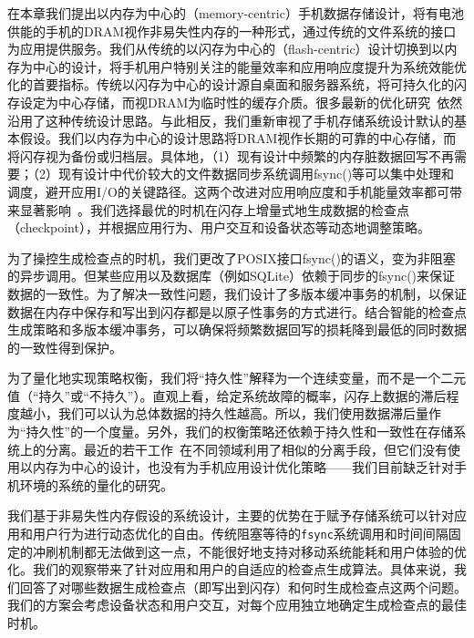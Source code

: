 在本章我们提出以内存为中心的（memory-centric）手机数据存储设计，将有电池供能的手机的DRAM视作非易失性内存的一种形式，通过传统的文件系统的接口为应用提供服务。我们从传统的以闪存为中心的（flash-centric）设计切换到以内存为中心的设计，将手机用户特别关注的能量效率和应用响应度提升为系统效能优化的首要指标。传统以闪存为中心的设计源自桌面和服务器系统，将可持久化的闪存设定为中心存储，而视DRAM为临时性的缓存介质。很多最新的优化研究~\cite{Jeong:2013:ISO:2535461.2535499, 6558430, Kim:2014:RJJ:2591305.2591332,
Nguyen:2014:ISR:2638728.2638841, Nguyen:2014:SAL:2638728.2638763,
Nguyen:2013:SSE:2493432.2493505, 6986137}依然沿用了这种传统设计思路。与此相反，我们重新审视了手机存储系统设计默认的基本假设。我们以内存为中心的设计思路将DRAM视作长期的可靠的中心存储，而将闪存视为备份或归档层。具体地，（1）现有设计中频繁的内存脏数据回写不再需要；（2）现有设计中代价较大的文件数据同步系统调用fsync()等可以集中处理和调度，避开应用I/O的关键路径。这两个改进对应用响应度和手机能量效率都可带来显著影响~\cite{Desnoyers:2013:SRN:2534861.2534867,Kim:RSS:2012, Lee:2012:SLD:2380356.2380367,Nguyen:2014:ISR:2638728.2638841}。我们选择最优的时机在闪存上增量式地生成数据的检查点（checkpoint），并根据应用行为、用户交互和设备状态等动态地调整策略。

为了操控生成检查点的时机，我们更改了POSIX接口fsync()的语义，变为非阻塞的异步调用。但某些应用以及数据库（例如SQLite）依赖于同步的fsync()来保证数据的一致性。为了解决一致性问题，我们设计了多版本缓冲事务的机制，以保证数据在内存中保存和写出到闪存都是以原子性事务的方式进行。结合智能的检查点生成策略和多版本缓冲事务，可以确保将频繁数据回写的损耗降到最低的同时数据的一致性得到保护。

为了量化地实现策略权衡，我们将“持久性”解释为一个连续变量，而不是一个二元值（“持久”或“不持久”）。直观上看，给定系统故障的概率，闪存上数据的滞后程度越小，我们可以认为总体数据的持久性越高。所以，我们使用数据滞后量作为“持久性”的一个度量。另外，我们的权衡策略还依赖于持久性和一致性在存储系统上的分离。最近的若干工作~\cite{Chidambaram:2013:OCC:2517349.2522726,
Mickens:2014:BFC:2616448.2616473}在不同领域利用了相似的分离手段，但它们没有使用以内存为中心的设计，也没有为手机应用设计优化策略——我们目前缺乏针对手机环境的系统的量化的研究。

我们基于非易失性内存假设的系统设计，主要的优势在于赋予存储系统可以针对应用和用户行为进行动态优化的自由。传统阻塞等待的\texttt{fsync}系统调用和时间间隔固定的冲刷机制都无法做到这一点，不能很好地支持对移动系统能耗和用户体验的优化。我们的观察带来了针对应用和用户的自适应的检查点生成算法。具体来说，我们回答了对哪些数据生成检查点（即写出到闪存）和何时生成检查点这两个问题。我们的方案会考虑设备状态和用户交互，对每个应用独立地确定生成检查点的最佳时机。

